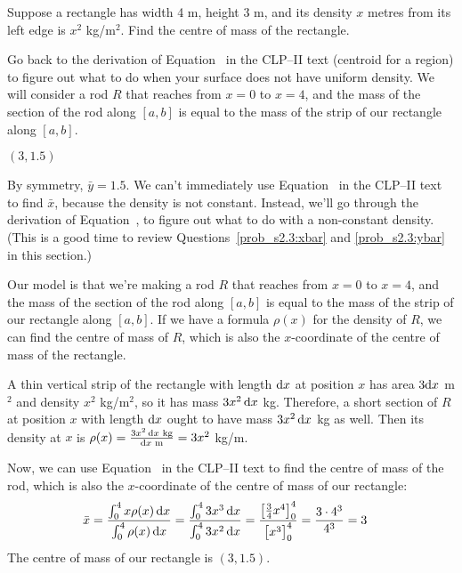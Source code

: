 \begin{Mquestion}
Suppose a rectangle has width 4 m, height 3 m, and its density $x$ metres from its left edge is $x^2$ kg/m$^2$. Find the centre of mass of the rectangle.

\begin{center}
\end{center}

\end{Mquestion}
\begin{hint}
Go back to the derivation of Equation~ in the CLP--II text (centroid for a region) to figure out what to do when your surface does not have uniform density. We will consider a rod $R$ that reaches from $x=0$ to $x=4$, and the mass of the section of the rod along $[a,b]$ is equal to the mass of the strip of our rectangle along $[a,b]$.
\end{hint}
\begin{answer}
$(3,1.5)$
\end{answer}
\begin{solution}
By symmetry, $\bar y = 1.5$. We can't immediately use Equation~  in the CLP--II text to find $\bar x$, because the density is not constant. Instead, we'll go through the derivation of Equation~, to figure out what to do with a non-constant density. (This is a good time to review Questions~\ref{prob_s2.3:xbar} and \ref{prob_s2.3:ybar} in this section.)

Our model is that we're making a rod $R$ that reaches from $x=0$ to $x=4$, and the mass of the section of the rod along $[a,b]$ is equal to the mass of the strip of our rectangle along $[a,b]$. If we have a formula $\rho(x)$ for the density of $R$, we can find the centre of mass of $R$, which is also the $x$-coordinate of the centre of mass of the rectangle.

A thin vertical strip of the rectangle with length $\mathrm{d}x$ at position $x$ has area $3\mathrm{d}x$ m$^2$ and density $x^2$ kg/m$^2$, so it has mass $3x^2\,\mathrm{d}x$ kg. Therefore, a short section of $R$ at position $x$ with length $\mathrm{d}x$ ought to have mass $3x^2\,\mathrm{d}x$ kg as well. Then its density at $x$ is $\rho(x) = \frac{3x^2\,\mathrm{d}x\text{ kg}}{\mathrm{d}x \text{ m}} = 3x^2$ kg/m.

Now, we can use Equation~ in the CLP--II text to find the centre of mass of the rod, which is also the $x$-coordinate of the centre of mass of our rectangle:
\begin{align*}
\bar x &= \frac{\int_0^4 x\rho(x)\,\mathrm{d}x}{\int_0^4 \rho(x)\,\mathrm{d}x}
= \frac{\int_0^4 3x^3\,\mathrm{d}x}{\int_0^4 3x^2\,\mathrm{d}x} =
\frac{\left[\frac{3}{4}x^4\right]_0^4}{\left[\vphantom{\frac34}x^3\right]_0^4}=\frac{3\cdot 4^3}{4^3}=3
\end{align*}
The centre of mass of our rectangle is $(3,1.5)$.
\end{solution}


